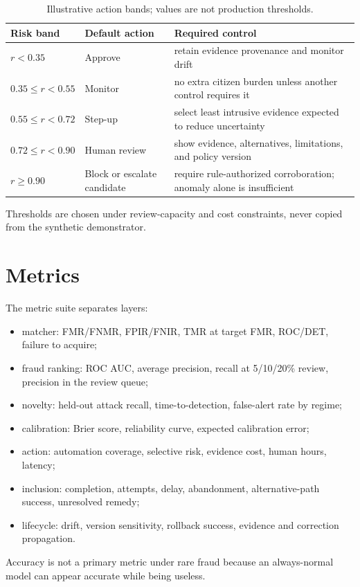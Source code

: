 \begin{table}[htbp]
\centering
\caption{Illustrative action bands; values are not production thresholds.}
\begin{tabularx}{\textwidth}{p{28mm}p{28mm}Y}
\toprule
Risk band & Default action & Required control\\
\midrule
$r<0.35$ & Approve & retain evidence provenance and monitor drift\\
$0.35\le r<0.55$ & Monitor & no extra citizen burden unless another control requires it\\
$0.55\le r<0.72$ & Step-up & select least intrusive evidence expected to reduce uncertainty\\
$0.72\le r<0.90$ & Human review & show evidence, alternatives, limitations, and policy version\\
$r\ge0.90$ & Block or escalate candidate & require rule-authorized corroboration; anomaly alone is insufficient\\
\bottomrule
\end{tabularx}
\end{table}

Thresholds are chosen under review-capacity and cost constraints, never copied from the synthetic demonstrator.

\section{Metrics}

The metric suite separates layers:

\begin{itemize}
\item matcher: FMR/FNMR, FPIR/FNIR, TMR at target FMR, ROC/DET, failure to acquire;
\item fraud ranking: ROC AUC, average precision, recall at 5/10/20\% review, precision in the review queue;
\item novelty: held-out attack recall, time-to-detection, false-alert rate by regime;
\item calibration: Brier score, reliability curve, expected calibration error;
\item action: automation coverage, selective risk, evidence cost, human hours, latency;
\item inclusion: completion, attempts, delay, abandonment, alternative-path success, unresolved remedy;
\item lifecycle: drift, version sensitivity, rollback success, evidence and correction propagation.
\end{itemize}

Accuracy is not a primary metric under rare fraud because an always-normal model can appear accurate while being useless.

